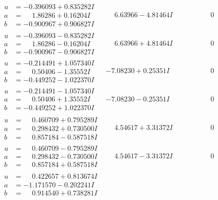 \documentclass[1p]{elsarticle_modified}
\theoremstyle{definition}
\begin{document}
$$\begin{array}{c|c|c}
\begin{aligned}
u &= -0.396093 + 0.835282 I \\
a &= \phantom{-}1.86286 + 0.16204 I \\
b &= -0.900967 + 0.906827 I\end{aligned}
 & \phantom{-}6.63966 - 4.81464 I & \phantom{-0.000000 } 0 \\ \hline\begin{aligned}
u &= -0.396093 - 0.835282 I \\
a &= \phantom{-}1.86286 - 0.16204 I \\
b &= -0.900967 - 0.906827 I\end{aligned}
 & \phantom{-}6.63966 + 4.81464 I & \phantom{-0.000000 } 0 \\ \hline\begin{aligned}
u &= -0.214491 + 1.057340 I \\
a &= \phantom{-}0.50406 - 1.35552 I \\
b &= -0.449252 - 1.022370 I\end{aligned}
 & -7.08230 + 0.25351 I & \phantom{-0.000000 } 0 \\ \hline\begin{aligned}
u &= -0.214491 - 1.057340 I \\
a &= \phantom{-}0.50406 + 1.35552 I \\
b &= -0.449252 + 1.022370 I\end{aligned}
 & -7.08230 - 0.25351 I & \phantom{-0.000000 } 0 \\ \hline\begin{aligned}
u &= \phantom{-}0.460709 + 0.795289 I \\
a &= \phantom{-}0.298432 + 0.730500 I \\
b &= \phantom{-}0.857184 - 0.587518 I\end{aligned}
 & \phantom{-}4.54617 + 3.31372 I & \phantom{-0.000000 } 0 \\ \hline\begin{aligned}
u &= \phantom{-}0.460709 - 0.795289 I \\
a &= \phantom{-}0.298432 - 0.730500 I \\
b &= \phantom{-}0.857184 + 0.587518 I\end{aligned}
 & \phantom{-}4.54617 - 3.31372 I & \phantom{-0.000000 } 0 \\ \hline\begin{aligned}
u &= \phantom{-}0.422657 + 0.813674 I \\
a &= -1.171570 - 0.202241 I \\
b &= \phantom{-}0.914540 + 0.738281 I\end{aligned}

\end{array}$$
\end{document}
